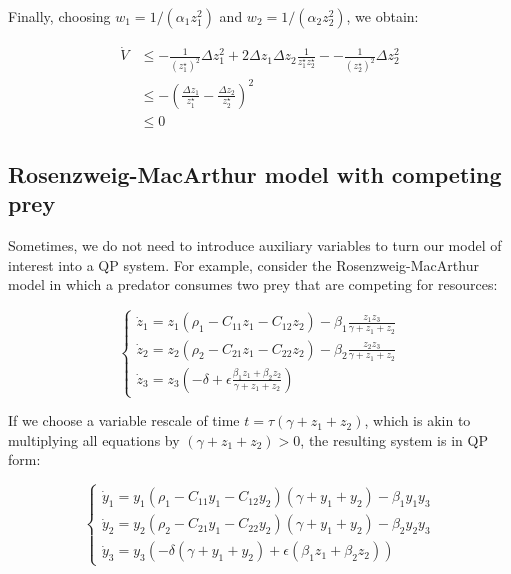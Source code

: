 \documentclass{article}
\begin{document}
Finally, choosing \(w_1 = 1 / (\alpha_1 z_1^2)\) and
\(w_2 = 1 / (\alpha_2 z_2^2)\), we obtain:

\begin{equation}
\begin{aligned}
\dot{V} &\leq -\frac{1}{(z_1^\star)^2} \Delta z_1^2 + 2 \Delta z_1 \Delta z_2 \frac{1}{z_1^\star z_2^\star} - -\frac{1}{(z_2^\star)^2} \Delta z_2^2 \\
&\leq - \left(\frac{\Delta z_1}{z_1^\star} - \frac{\Delta z_2}{z_2^\star}\right)^2 \\
&\leq 0
\end{aligned}
\end{equation}

\hypertarget{rosenzweig-macarthur-model-with-competing-prey}{%
\subsection{Rosenzweig-MacArthur model with competing
prey}\label{rosenzweig-macarthur-model-with-competing-prey}}

Sometimes, we do not need to introduce auxiliary variables to turn our
model of interest into a QP system. For example, consider the
Rosenzweig-MacArthur model in which a predator consumes two prey that
are competing for resources:

\begin{equation}
\begin{cases}
\dot{z}_1 = z_1 (\rho_1 - C_{11} z_1 - C_{12} z_2) - \beta_1 \frac{z_1 z_3}{\gamma + z_1 + z_2}\\
\dot{z}_2 = z_2 (\rho_2 - C_{21} z_1 - C_{22} z_2) - \beta_2 \frac{z_2 z_3}{\gamma + z_1 + z_2}\\
\dot{z}_3 = z_3 \left(-\delta + \epsilon \frac{\beta_1 z_1 + \beta_2 z_2}{\gamma + z_1 + z_2} \right)
\end{cases}
\end{equation}

If we choose a variable rescale of time
\(t = \tau (\gamma + z_1 + z_2)\), which is akin to multiplying all
equations by \((\gamma + z_1 + z_2) > 0\), the resulting system is in QP
form:

\begin{equation}
\begin{cases}
\dot{y}_1 = y_1 (\rho_1 - C_{11} y_1 - C_{12} y_2)(\gamma + y_1 + y_2) - \beta_1 y_1 y_3\\
\dot{y}_2 = y_2 (\rho_2 - C_{21} y_1 - C_{22} y_2)(\gamma + y_1 + y_2) - \beta_2 y_2 y_3\\
\dot{y}_3 = y_3 \left(-\delta (\gamma + y_1 + y_2) + \epsilon (\beta_1 z_1 + \beta_2 z_2) \right)
\end{cases}
\end{equation}
\end{document}
